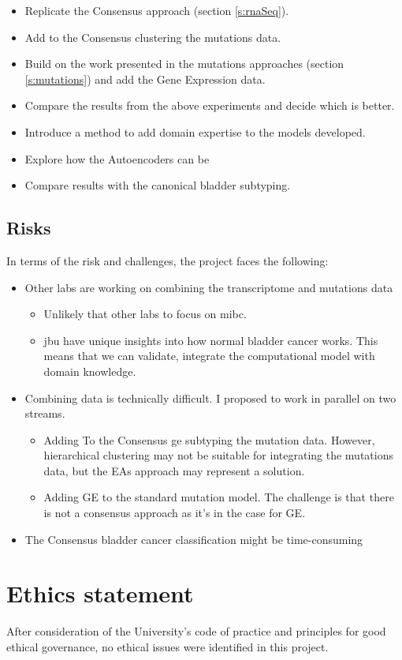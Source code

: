 \begin{itemize} 
    \item Replicate the Consensus approach (section \ref{s:rnaSeq}).
    \item Add to the Consensus clustering the mutations data.
    \item Build on the work presented in the mutations approaches (section \ref{s:mutations}) and add the Gene Expression data.
    \item Compare the results from the above experiments and decide which is better.
    \item Introduce a method to add domain expertise to the models developed.
    \item Explore how the Autoencoders can be 
    \item Compare results with the canonical bladder subtyping.
\end{itemize}

\subsection{Risks} \label{s:risks}

In terms of the risk and challenges, the project faces the following:

\begin{itemize}
    \item Other labs are working on  combining the transcriptome and mutations data
    \begin{itemize}
        \item Unlikely that other labs to focus on \acrlong{mibc}.
        \item \acrlong{jbu} have unique insights into how normal bladder cancer works. This means that we can validate, integrate the computational model with domain knowledge.
    \end{itemize}
    \item Combining data is technically difficult. I proposed to work in parallel on two streams. 
    \begin{itemize}
        \item Adding To the Consensus \acrfull{ge} subtyping the mutation data. However, hierarchical clustering may not be suitable for integrating the mutations data, but the EAs approach may represent a solution.
        \item Adding GE to the standard mutation model. The challenge is that there is not a consensus approach as it's in the case for GE.
    \end{itemize}
    \item The Consensus bladder cancer classification might be time-consuming
\end{itemize}


\section{Ethics statement}

After consideration of the University's code of practice and principles for good ethical governance, no ethical issues were identified in this project. 
